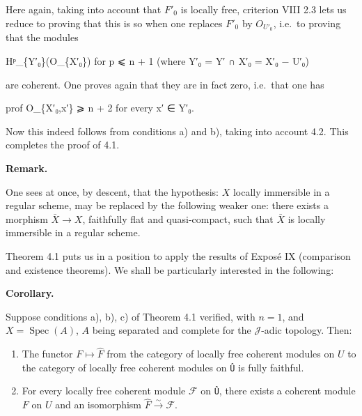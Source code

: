 \documentclass[
  11pt,
  a4paper,
]{book}
\newenvironment{Shaded}{}{}
\newcommand{\NormalTok}[1]{#1}
\providecommand{\tightlist}{%
  \setlength{\itemsep}{0pt}\setlength{\parskip}{0pt}}
\begin{document}
Here again, taking into account that \(F'_{0}\) is locally free,
criterion VIII 2.3 lets us reduce to proving that this is so when one
replaces \(F'_{0}\) by \(O_{U'_{0}}\), i.e.~to proving that the modules

\begin{Shaded}
\begin{Highlighting}[]
\NormalTok{Hᵖ\_\{Y′₀\}(O\_\{X′₀\}) for p ⩽ n + 1  (where Y′₀ = Y′ ∩ X′₀ = X′₀ − U′₀)}
\end{Highlighting}
\end{Shaded}

are coherent. One proves again that they are in fact zero, i.e.~that one
has

\begin{Shaded}
\begin{Highlighting}[]
\NormalTok{prof O\_\{X′₀,x′\} ⩾ n + 2 for every x′ ∈ Y′₀.}
\end{Highlighting}
\end{Shaded}

Now this indeed follows from conditions a) and b), taking into account
4.2. This completes the proof of 4.1.

\textbf{Remark.}

One sees at once, by descent, that the hypothesis: \(X\) locally
immersible in a regular scheme, may be replaced by the following weaker
one: there exists a morphism \(\bar{X} \to X\), faithfully flat and
quasi-compact, such that \(\bar{X}\) is locally immersible in a regular
scheme.

Theorem 4.1 puts us in a position to apply the results of Exposé IX
(comparison and existence theorems). We shall be particularly interested
in the following:

\textbf{Corollary.}

Suppose conditions a), b), c) of Theorem 4.1 verified, with \(n = 1\),
and \(X = \operatorname{Spec}(A)\), \(A\) being separated and complete
for the \(\mathcal{J}\)-adic topology. Then:

\begin{enumerate}
\def\labelenumi{\arabic{enumi}.}
\tightlist
\item
  The functor \(F \mapsto \hat{F}\) from the category of locally free
  coherent modules on \(U\) to the category of locally free coherent
  modules on \texttt{Û} is fully faithful.
\item
  For every locally free coherent module \(\mathcal{F}\) on \texttt{Û},
  there exists a coherent module \(F\) on \(U\) and an isomorphism
  \(\hat{F} \xrightarrow{\sim} \mathcal{F}\).
\end{enumerate}
\end{document}
